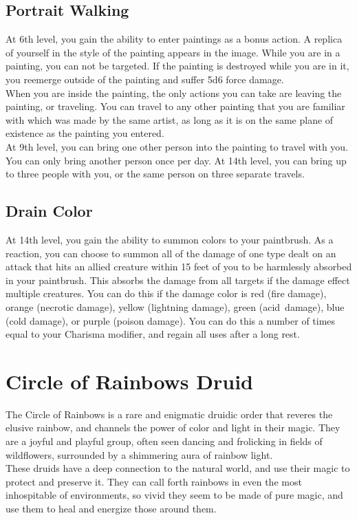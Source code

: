 \subsection{Portrait Walking}
At 6th level, you gain the ability to enter paintings as a bonus action. A replica of yourself in the style of the painting appears in the image. While you are in a painting, you can not be targeted. If the painting is destroyed while you are in it, you reemerge outside of the painting and suffer 5d6 force damage. \\
When you are inside the painting, the only actions you can take are leaving the painting, or traveling. You can travel to any other painting that you are familiar with which was made by the same artist, as long as it is on the same plane of existence as the painting you entered. \\
At 9th level, you can bring one other person into the painting to travel with you. You can only bring another person once per day. At 14th level, you can bring up to three people with you, or the same person on three separate travels.
\subsection{Drain Color}
At 14th level, you gain the ability to summon colors to your paintbrush. As a reaction, you can choose to summon all of the damage of one type dealt on an attack that hits an allied creature within 15 feet of you to be harmlessly absorbed in your paintbrush. This absorbs the damage from all targets if the damage effect multiple creatures. You can do this if the damage color is red (fire damage), orange (necrotic damage), yellow (lightning damage), green (acid~damage), blue (cold damage), or purple (poison damage). You can do this a number of times equal to your Charisma modifier, and regain all uses after a long rest.
\raggedbottom
\pagebreak
\section{Circle of Rainbows Druid}\label{Rainbow}
The Circle of Rainbows is a rare and enigmatic druidic order that reveres the elusive rainbow, and channels the power of color and light in their magic. They are a joyful and playful group, often seen dancing and frolicking in fields of wildflowers, surrounded by a shimmering aura of rainbow light.\\
These druids have a deep connection to the natural world, and use their magic to protect and preserve it. They can call forth rainbows in even the most inhospitable of environments, so vivid they seem to be made of pure magic, and use them to heal and energize those around them.


